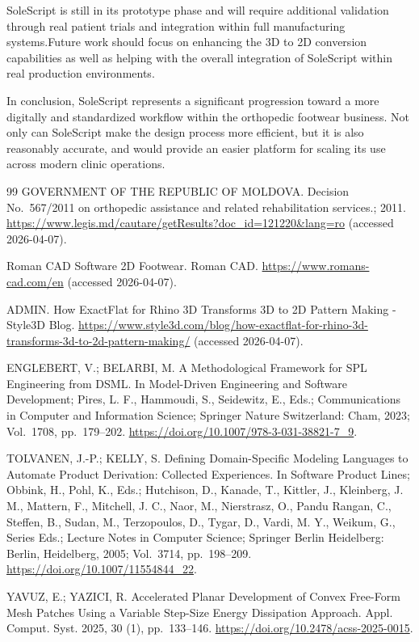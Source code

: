 \documentclass[12pt,a4paper]{article}
\begin{document}
SoleScript is still in its prototype phase and will require additional validation through real patient trials and integration within full manufacturing systems.Future work should focus on enhancing the 3D to 2D conversion capabilities as well as helping with the overall integration of SoleScript within real production environments.

In conclusion, SoleScript represents a significant progression toward a more digitally and standardized workflow within the orthopedic footwear business. Not only can SoleScript make the design process more efficient, but it is also reasonably accurate, and would provide an easier platform for scaling its use across modern clinic operations.

\begin{thebibliography}{99}
\label{lege-ref}
GOVERNMENT OF THE REPUBLIC OF MOLDOVA. Decision No.~567/2011 on orthopedic assistance and related rehabilitation services.; 2011. \url{https://www.legis.md/cautare/getResults?doc_id=121220&lang=ro} (accessed 2026-04-07).

\label{romanscad-ref}
Roman CAD Software 2D Footwear. Roman CAD. \url{https://www.romans-cad.com/en} (accessed 2026-04-07).

\label{exactflat-ref}
ADMIN. How ExactFlat for Rhino 3D Transforms 3D to 2D Pattern Making - Style3D Blog. \url{https://www.style3d.com/blog/how-exactflat-for-rhino-3d-transforms-3d-to-2d-pattern-making/} (accessed 2026-04-07).

\label{ameur-ref}
ENGLEBERT, V.; BELARBI, M. A Methodological Framework for SPL Engineering from DSML. In Model-Driven Engineering and Software Development; Pires, L. F., Hammoudi, S., Seidewitz, E., Eds.; Communications in Computer and Information Science; Springer Nature Switzerland: Cham, 2023; Vol.~1708, pp.~179--202. \url{https://doi.org/10.1007/978-3-031-38821-7_9}.

\label{dsmcore-ref}
TOLVANEN, J.-P.; KELLY, S. Defining Domain-Specific Modeling Languages to Automate Product Derivation: Collected Experiences. In Software Product Lines; Obbink, H., Pohl, K., Eds.; Hutchison, D., Kanade, T., Kittler, J., Kleinberg, J. M., Mattern, F., Mitchell, J. C., Naor, M., Nierstrasz, O., Pandu Rangan, C., Steffen, B., Sudan, M., Terzopoulos, D., Tygar, D., Vardi, M. Y., Weikum, G., Series Eds.; Lecture Notes in Computer Science; Springer Berlin Heidelberg: Berlin, Heidelberg, 2005; Vol.~3714, pp.~198--209. \url{https://doi.org/10.1007/11554844_22}.

\label{flatten-ref}
YAVUZ, E.; YAZICI, R. Accelerated Planar Development of Convex Free-Form Mesh Patches Using a Variable Step-Size Energy Dissipation Approach. Appl. Comput. Syst. 2025, 30 (1), pp.~133--146. \url{https://doi.org/10.2478/acss-2025-0015}.
\end{thebibliography}
\end{document}
